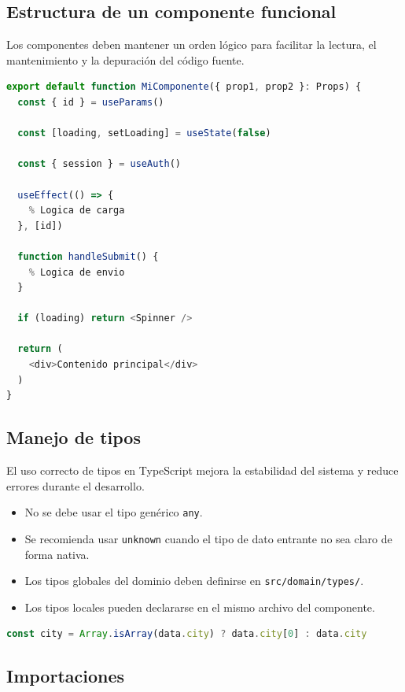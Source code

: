 \documentclass[12pt,letterpaper]{article}
\newcommand{\code}[1]{\nolinkurl{#1}}
\begin{document}
\subsection{Estructura de un componente funcional}

Los componentes deben mantener un orden lógico para facilitar la lectura, el mantenimiento y la depuración del código fuente.

\begin{lstlisting}[language=typescript]
export default function MiComponente({ prop1, prop2 }: Props) {
  const { id } = useParams()

  const [loading, setLoading] = useState(false)

  const { session } = useAuth()

  useEffect(() => {
    % Logica de carga
  }, [id])

  function handleSubmit() {
    % Logica de envio
  }

  if (loading) return <Spinner />

  return (
    <div>Contenido principal</div>
  )
}
\end{lstlisting}

\subsection{Manejo de tipos}

El uso correcto de tipos en TypeScript mejora la estabilidad del sistema y reduce errores durante el desarrollo.

\begin{itemize}
    \item No se debe usar el tipo genérico \code{any}.
    \item Se recomienda usar \code{unknown} cuando el tipo de dato entrante no sea claro de forma nativa.
    \item Los tipos globales del dominio deben definirse en \code{src/domain/types/}.
    \item Los tipos locales pueden declararse en el mismo archivo del componente.
\end{itemize}

\begin{lstlisting}[language=typescript]
const city = Array.isArray(data.city) ? data.city[0] : data.city
\end{lstlisting}

\subsection{Importaciones}
\end{document}
